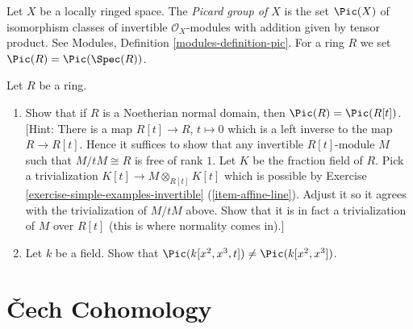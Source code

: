 \begin{definition}
\label{definition-picard-group}
Let $X$ be a locally ringed space.
The {\it Picard group of $X$} is the set $\Pic(X)$
of isomorphism classes of invertible $\mathcal{O}_X$-modules
with addition given by tensor product.
See Modules, Definition \ref{modules-definition-pic}.
For a ring $R$ we set $\Pic(R) = \Pic(\Spec(R))$.
\end{definition}

\begin{exercise}
\label{exercise-traverso}
Let $R$ be a ring.
\begin{enumerate}
\item Show that if $R$ is a Noetherian normal domain, then
$\Pic(R) = \Pic(R[t])$. [Hint: There is a map
$R[t] \to R$, $t \mapsto 0$ which is a left inverse to the map
$R \to R[t]$. Hence it suffices to show that any invertible
$R[t]$-module $M$ such that $M/tM \cong R$ is free of rank $1$.
Let $K$ be the fraction field of $R$.
Pick a trivialization $K[t] \to M \otimes_{R[t]} K[t]$ which is possible by
Exercise \ref{exercise-simple-examples-invertible} (\ref{item-affine-line}).
Adjust it so it agrees with the trivialization
of $M/tM$ above. Show that it is in fact a trivialization of
$M$ over $R[t]$ (this is where normality comes in).]
\item Let $k$ be a field. Show that
$\Pic(k[x^2, x^3, t]) \not = \Pic(k[x^2, x^3])$.
\end{enumerate}
\end{exercise}













\section{{\v C}ech Cohomology}
\label{section-cech-cohomology}

